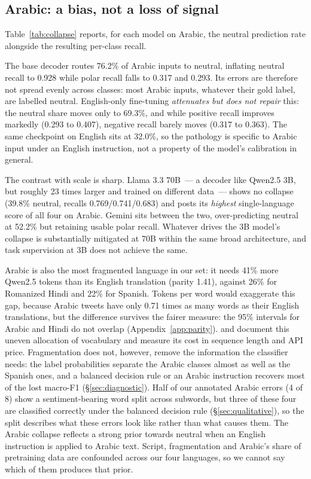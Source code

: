 \documentclass[11pt]{article}
\begin{document}
\subsection{Arabic: a bias, not a loss of signal}
\label{sec:collapse}

Table~\ref{tab:collapse} reports, for each model on Arabic, the neutral prediction
rate alongside the resulting per-class recall.

The base decoder routes 76.2\% of Arabic inputs to neutral, inflating neutral
recall to 0.928 while polar recall falls to 0.317 and 0.293. Its errors are
therefore not spread evenly across classes: most Arabic inputs, whatever their gold
label, are labelled neutral. English-only fine-tuning
\emph{attenuates but does not repair} this: the neutral share moves only to
69.3\%, and while positive recall improves markedly (0.293 to 0.407), negative
recall barely moves (0.317 to 0.363). The same checkpoint on English sits at
32.0\%, so the pathology is specific to Arabic input under an English instruction,
not a property of the model's calibration in general.

The contrast with scale is sharp. Llama 3.3 70B~--- a decoder like Qwen2.5 3B, but
roughly 23 times larger and trained on different data~--- shows no collapse (39.8\% neutral,
recalls 0.769/0.741/0.683) and posts its \emph{highest} single-language score of
all four on Arabic. Gemini sits between the two, over-predicting neutral at 52.2\%
but retaining usable polar recall. Whatever drives the 3B model's collapse is
substantially mitigated at 70B within the same broad architecture, and task
supervision at 3B does not achieve the same.

Arabic is also the most fragmented language in our set: it needs 41\% more
Qwen2.5 tokens than its English translation (parity 1.41), against 26\% for
Romanized Hindi and 22\% for Spanish. Tokens per word would exaggerate this gap,
because Arabic tweets have only 0.71 times as many words as their English
translations, but the difference survives the fairer measure: the 95\% intervals for
Arabic and Hindi do not overlap (Appendix~\ref{app:parity}).
\citet{petrov2023tokenizers} and \citet{ahia2023cost} document this uneven
allocation of vocabulary and measure its cost in sequence length and API price.
Fragmentation does not, however, remove the information the classifier needs: the
label probabilities separate the Arabic classes almost as well as the Spanish ones,
and a balanced decision rule or an Arabic instruction recovers most of the lost
macro-F1 (\S\ref{sec:diagnostic}). Half of our annotated Arabic errors (4 of 8)
show a sentiment-bearing word split across subwords, but three of these four are
classified correctly under the balanced decision rule (\S\ref{sec:qualitative}), so the
split describes what these errors look like rather than what causes them. The
Arabic collapse reflects a strong prior towards neutral when an English instruction
is applied to Arabic text. Script, fragmentation and Arabic's share of pretraining
data are confounded across our four languages, so we cannot say which of them
produces that prior.
\end{document}

